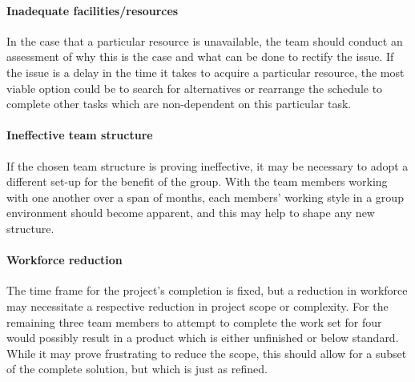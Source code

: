 \paragraph{Inadequate facilities/resources}
In the case that a particular resource is unavailable, the team should conduct an assessment of why this is the case and what can be done to rectify the issue. If the issue is a delay in the time it takes to acquire a particular resource, the most viable option could be to search for alternatives or rearrange the schedule to complete other tasks which are non-dependent on this particular task.

\paragraph{Ineffective team structure}
If the chosen team structure is proving ineffective, it may be necessary to adopt a different set-up for the benefit of the group. With the team members working with one another over a span of months, each members' working style in a group environment should become apparent, and this may help to shape any new structure.

\paragraph{Workforce reduction}
The time frame for the project's completion is fixed, but a reduction in workforce may necessitate a respective reduction in project scope or complexity. For the remaining three team members to attempt to complete the work set for four would possibly result in a product which is either unfinished or below standard. While it may prove frustrating to reduce the scope, this should allow for a subset of the complete solution, but which is just as refined.
